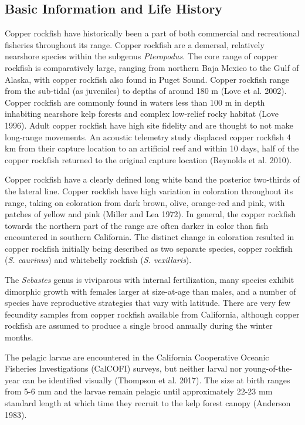 \documentclass[11pt,
  english,
  letterpaper,
]{article}
\begin{document}
\hypertarget{basic-information-and-life-history}{%
\subsection{Basic Information and Life History}\label{basic-information-and-life-history}}

Copper rockfish have historically been a part of both commercial and recreational fisheries throughout its range. Copper rockfish are a demersal, relatively nearshore species within the subgenus \emph{Pteropodus.} The core range of copper rockfish is comparatively large, ranging from northern Baja Mexico to the Gulf of Alaska, with copper rockfish also found in Puget Sound. Copper rockfish range from the sub-tidal (as juveniles) to depths of around 180 m (Love et al. 2002). Copper rockfish are commonly found in waters less than 100 m in depth inhabiting nearshore kelp forests and complex low-relief rocky habitat (Love 1996). Adult copper rockfish have high site fidelity and are thought to not make long-range movements. An acoustic telemetry study displaced copper rockfish 4 km from their capture location to an artificial reef and within 10 days, half of the copper rockfish returned to the original capture location (Reynolds et al. 2010).

Copper rockfish have a clearly defined long white band the posterior two-thirds of the lateral line. Copper rockfish have high variation in coloration throughout its range, taking on coloration from dark brown, olive, orange-red and pink, with patches of yellow and pink (Miller and Lea 1972). In general, the copper rockfish towards the northern part of the range are often darker in color than fish encountered in southern California. The distinct change in coloration resulted in copper rockfish initially being described as two separate species, copper rockfish (\emph{S. caurinus}) and whitebelly rockfish (\emph{S. vexillaris}).

The \emph{Sebastes} genus is viviparous with internal fertilization, many species exhibit dimorphic growth with females larger at size-at-age than males, and a number of species have reproductive strategies that vary with latitude. There are very few fecundity samples from copper rockfish available from California, although copper rockfish are assumed to produce a single brood annually during the winter months.

The pelagic larvae are encountered in the California Cooperative Oceanic Fisheries Investigations (CalCOFI) surveys, but neither larval nor young-of-the-year can be identified visually (Thompson et al. 2017). The size at birth ranges from 5-6 mm and the larvae remain pelagic until approximately 22-23 mm standard length at which time they recruit to the kelp forest canopy (Anderson 1983).
\end{document}
